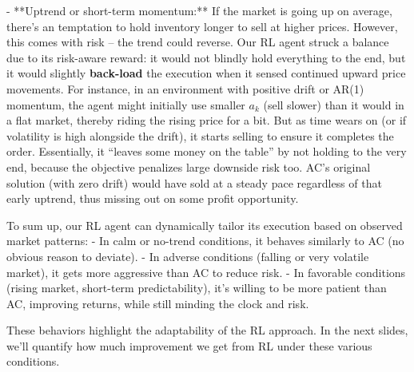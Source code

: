 \documentclass[11pt]{article}
\begin{document}
		- **Uptrend or short-term momentum:** If the market is going up on average, there’s an temptation to hold inventory longer to sell at higher prices. However, this comes with risk – the trend could reverse. Our RL agent struck a balance due to its risk-aware reward: it would not blindly hold everything to the end, but it would slightly \textbf{back-load} the execution when it sensed continued upward price movements. For instance, in an environment with positive drift or AR(1) momentum, the agent might initially use smaller $a_k$ (sell slower) than it would in a flat market, thereby riding the rising price for a bit. But as time wears on (or if volatility is high alongside the drift), it starts selling to ensure it completes the order. Essentially, it “leaves some money on the table” by not holding to the very end, because the objective penalizes large downside risk too. AC’s original solution (with zero drift) would have sold at a steady pace regardless of that early uptrend, thus missing out on some profit opportunity. 
		
		To sum up, our RL agent can dynamically tailor its execution based on observed market patterns:
		- In calm or no-trend conditions, it behaves similarly to AC (no obvious reason to deviate).
		- In adverse conditions (falling or very volatile market), it gets more aggressive than AC to reduce risk.
		- In favorable conditions (rising market, short-term predictability), it’s willing to be more patient than AC, improving returns, while still minding the clock and risk.
		
		These behaviors highlight the adaptability of the RL approach. In the next slides, we’ll quantify how much improvement we get from RL under these various conditions.
	
	
	
\end{document}
